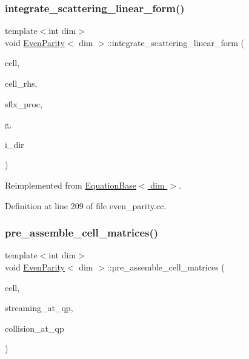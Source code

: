 \subsubsection{\texorpdfstring{integrate\+\_\+scattering\+\_\+linear\+\_\+form()}{integrate\_scattering\_linear\_form()}}
{\footnotesize\ttfamily template$<$int dim$>$ \\
void \hyperlink{class_even_parity}{Even\+Parity}$<$ dim $>$\+::integrate\+\_\+scattering\+\_\+linear\+\_\+form (\begin{DoxyParamCaption}\item[{typename Do\+F\+Handler$<$ dim $>$\+::active\+\_\+cell\+\_\+iterator \&}]{cell,  }\item[{Vector$<$ double $>$ \&}]{cell\+\_\+rhs,  }\item[{std\+::vector$<$ Vector$<$ double $>$ $>$ \&}]{sflx\+\_\+proc,  }\item[{const unsigned int \&}]{g,  }\item[{const unsigned int \&}]{i\+\_\+dir }\end{DoxyParamCaption})\hspace{0.3cm}{\ttfamily [virtual]}}



Reimplemented from \hyperlink{class_equation_base_aca5998c1afd2b89ee93d3fbbfde7f3d0}{Equation\+Base$<$ dim $>$}.



Definition at line 209 of file even\+\_\+parity.\+cc.

\mbox{\label{class_even_parity_a4cc64002161193e2227e962c9ecb8cf5}} 
\subsubsection{\texorpdfstring{pre\+\_\+assemble\+\_\+cell\+\_\+matrices()}{pre\_assemble\_cell\_matrices()}}
{\footnotesize\ttfamily template$<$int dim$>$ \\
void \hyperlink{class_even_parity}{Even\+Parity}$<$ dim $>$\+::pre\+\_\+assemble\+\_\+cell\+\_\+matrices (\begin{DoxyParamCaption}\item[{typename Do\+F\+Handler$<$ dim $>$\+::active\+\_\+cell\+\_\+iterator \&}]{cell,  }\item[{std\+::vector$<$ std\+::vector$<$ Full\+Matrix$<$ double $>$ $>$ $>$ \&}]{streaming\+\_\+at\+\_\+qp,  }\item[{std\+::vector$<$ Full\+Matrix$<$ double $>$ $>$ \&}]{collision\+\_\+at\+\_\+qp }\end{DoxyParamCaption})\hspace{0.3cm}{\ttfamily [virtual]}}



